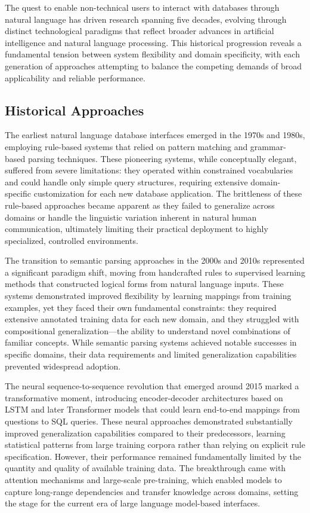 The quest to enable non-technical users to interact with databases through natural language has driven research spanning five decades, evolving through distinct technological paradigms that reflect broader advances in artificial intelligence and natural language processing. This historical progression reveals a fundamental tension between system flexibility and domain specificity, with each generation of approaches attempting to balance the competing demands of broad applicability and reliable performance.

\subsection{Historical Approaches}

The earliest natural language database interfaces emerged in the 1970s and 1980s, employing rule-based systems that relied on pattern matching and grammar-based parsing techniques. These pioneering systems, while conceptually elegant, suffered from severe limitations: they operated within constrained vocabularies and could handle only simple query structures, requiring extensive domain-specific customization for each new database application. The brittleness of these rule-based approaches became apparent as they failed to generalize across domains or handle the linguistic variation inherent in natural human communication, ultimately limiting their practical deployment to highly specialized, controlled environments.

The transition to semantic parsing approaches in the 2000s and 2010s represented a significant paradigm shift, moving from handcrafted rules to supervised learning methods that constructed logical forms from natural language inputs. These systems demonstrated improved flexibility by learning mappings from training examples, yet they faced their own fundamental constraints: they required extensive annotated training data for each new domain, and they struggled with compositional generalization—the ability to understand novel combinations of familiar concepts. While semantic parsing systems achieved notable successes in specific domains, their data requirements and limited generalization capabilities prevented widespread adoption.

The neural sequence-to-sequence revolution that emerged around 2015 marked a transformative moment, introducing encoder-decoder architectures based on LSTM and later Transformer models that could learn end-to-end mappings from questions to SQL queries. These neural approaches demonstrated substantially improved generalization capabilities compared to their predecessors, learning statistical patterns from large training corpora rather than relying on explicit rule specification. However, their performance remained fundamentally limited by the quantity and quality of available training data. The breakthrough came with attention mechanisms and large-scale pre-training, which enabled models to capture long-range dependencies and transfer knowledge across domains, setting the stage for the current era of large language model-based interfaces.

